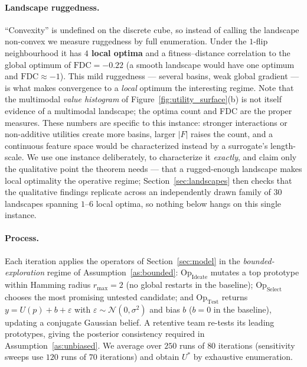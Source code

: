 \documentclass[11pt]{article}
\newcommand{\Op}[1]{\mathrm{Op}_{\mathrm{#1}}}
\begin{document}
\paragraph{Landscape ruggedness.}
``Convexity'' is undefined on the discrete cube, so instead of calling the landscape non-convex we measure ruggedness by full enumeration. Under the $1$-flip neighbourhood it has \textbf{$4$ local optima} and a fitness--distance correlation to the global optimum of \textbf{$\mathrm{FDC}=-0.22$} (a smooth landscape would have one optimum and $\mathrm{FDC}\approx-1$). This mild ruggedness --- several basins, weak global gradient --- is what makes convergence to a \emph{local} optimum the interesting regime. Note that the multimodal \emph{value histogram} of Figure~\ref{fig:utility_surface}(b) is not itself evidence of a multimodal landscape; the optima count and FDC are the proper measures. These numbers are specific to this instance: stronger interactions or non-additive utilities create more basins, larger $|F|$ raises the count, and a continuous feature space would be characterized instead by a surrogate's length-scale. We use one instance deliberately, to characterize it \emph{exactly}, and claim only the qualitative point the theorem needs --- that a rugged-enough landscape makes local optimality the operative regime; Section~\ref{sec:landscapes} then checks that the qualitative findings replicate across an independently drawn family of $30$ landscapes spanning $1$--$6$ local optima, so nothing below hangs on this single instance.

\paragraph{Process.}
Each iteration applies the operators of Section~\ref{sec:model} in the \emph{bounded-exploration} regime of Assumption~\ref{as:bounded}: $\Op{Ideate}$ mutates a top prototype within Hamming radius $r_{\max}=2$ (no global restarts in the baseline); $\Op{Select}$ chooses the most promising untested candidate; and $\Op{Test}$ returns $y=U(p)+b+\varepsilon$ with $\varepsilon\sim\mathcal{N}(0,\sigma^2)$ and bias $b$ ($b=0$ in the baseline), updating a conjugate Gaussian belief. A retentive team re-tests its leading prototypes, giving the posterior consistency required in Assumption~\ref{as:unbiased}. We average over $250$ runs of $80$ iterations (sensitivity sweeps use $120$ runs of $70$ iterations) and obtain $U^*$ by exhaustive enumeration.
\end{document}
